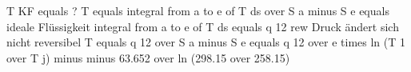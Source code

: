 T KF equals ?  
T equals integral from a to e of T ds over S a minus S e equals ideale Flüssigkeit  
integral from a to e of T ds equals q 12 rew  
Druck ändert sich nicht reversibel  
T equals q 12 over S a minus S e equals q 12 over e times ln (T 1 over T j) minus minus 63.652 over ln (298.15 over 258.15)